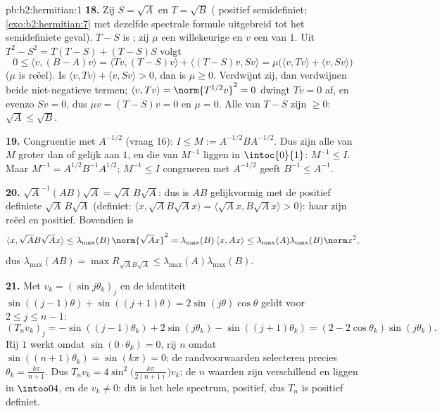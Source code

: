 \begin{solution}{pb:b2:hermitian:1}
\textbf{18.} Zij $S = \sqrt A$ en $T = \sqrt B$ (
positief semidefiniet; \cref{exo:b2:hermitian:7} met dezelfde
spectrale formule uitgebreid tot het semidefiniete geval). $T - S$
is ; zij $\mu$ een willekeurige  en $v$ een
 van  $1$. Uit $T^2 - S^2 = T(T - S) + (T - S)S$
volgt
\[
0 \leq \langle v, (B - A)v\rangle
= \langle Tv, (T-S)v\rangle + \langle (T-S)v, Sv\rangle
= \mu\bigl(\langle v, Tv\rangle + \langle v,
Sv\rangle\bigr)
\]
($\mu$ is reëel). Is $\langle v, Tv\rangle + \langle v, Sv\rangle >
0$, dan is $\mu \geq 0$. Verdwijnt zij, dan verdwijnen beide
niet-negatieve termen; $\langle v, Tv\rangle = \norm{T^{1/2}v}^2 =
0$ dwingt $Tv = 0$ af, en evenzo $Sv = 0$, dus $\mu v = (T - S)v =
0$ en $\mu = 0$. Alle  van $T - S$ zijn $\geq 0$:
$\sqrt A \leq \sqrt B$.

\textbf{19.} Congruentie met $A^{-1/2}$ (vraag 16): $I \leq M :=
A^{-1/2}BA^{-1/2}$. Dus zijn alle  van $M$ groter dan
of gelijk aan $1$, en die van $M^{-1}$ liggen in $\intoc{0}{1}$:
$M^{-1} \leq I$. Maar $M^{-1} = A^{1/2}B^{-1}A^{1/2}$; $M^{-1} \leq
I$ congrueren met $A^{-1/2}$ geeft $B^{-1} \leq A^{-1}$.

\textbf{20.} $\sqrt A^{-1}(AB)\sqrt A = \sqrt A\,B\sqrt A$: dus is
$AB$ gelijkvormig met de  positief definiete $\sqrt
A\,B\sqrt A$ (definiet: $\langle x, \sqrt AB\sqrt Ax\rangle =
\langle \sqrt Ax, B\sqrt Ax\rangle > 0$): haar  zijn
reëel en positief. Bovendien is
\[
\langle x, \sqrt AB\sqrt Ax\rangle
\leq \lambda_{\max}(B)\,\norm{\sqrt Ax}^2
= \lambda_{\max}(B)\,\langle x, Ax\rangle
\leq \lambda_{\max}(A)\lambda_{\max}(B)\norm x^2 ,
\]
dus $\lambda_{\max}(AB) = \max R_{\sqrt AB\sqrt A} \leq
\lambda_{\max}(A)\lambda_{\max}(B)$.

\textbf{21.} Met $v_k = (\sin j\theta_k)_j$ en de identiteit
$\sin((j-1)\theta) + \sin((j+1)\theta) = 2\sin(j\theta)\cos\theta$
geldt voor $2 \leq j \leq n-1$:
\[
(T_nv_k)_j = -\sin((j{-}1)\theta_k) + 2\sin(j\theta_k) -
\sin((j{+}1)\theta_k)
= (2 - 2\cos\theta_k)\sin(j\theta_k) .
\]
Rij $1$ werkt omdat $\sin(0\cdot\theta_k) = 0$, rij $n$ omdat
$\sin((n+1)\theta_k) = \sin(k\pi) = 0$: de randvoorwaarden
selecteren precies $\theta_k = \frac{k\pi}{n+1}$. Dus $T_nv_k =
4\sin^2\bigl(\frac{k\pi}{2(n+1)}\bigr)v_k$; de $n$ waarden zijn
verschillend en liggen in $\intoo04$, en de $v_k \neq 0$: dit is
het hele spectrum, positief, dus $T_n$ is positief definiet.


\end{solution}
